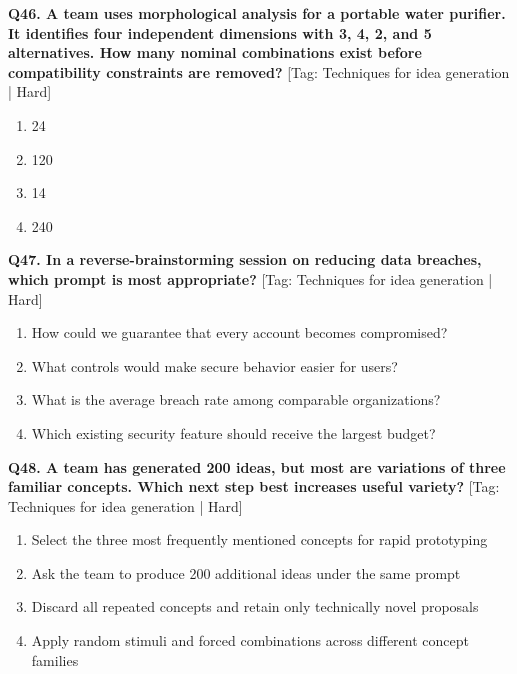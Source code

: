 \noindent\textbf{Q46. A team uses morphological analysis for a portable water purifier. It identifies four independent dimensions with 3, 4, 2, and 5 alternatives. How many nominal combinations exist before compatibility constraints are removed?} \hfill [Tag: Techniques for idea generation | Hard]
\begin{enumerate}[label=(\alph*),topsep=2pt,itemsep=1pt,partopsep=0pt,parsep=0pt]
    \item {24}
    \item {120}
    \item {14}
    \item {240}
\end{enumerate}
\vspace{2mm}

\noindent\textbf{Q47. In a reverse-brainstorming session on reducing data breaches, which prompt is most appropriate?} \hfill [Tag: Techniques for idea generation | Hard]
\begin{enumerate}[label=(\alph*),topsep=2pt,itemsep=1pt,partopsep=0pt,parsep=0pt]
    \item {How could we guarantee that every account becomes compromised?}
    \item {What controls would make secure behavior easier for users?}
    \item {What is the average breach rate among comparable organizations?}
    \item {Which existing security feature should receive the largest budget?}
\end{enumerate}
\vspace{2mm}

\noindent\textbf{Q48. A team has generated 200 ideas, but most are variations of three familiar concepts. Which next step best increases useful variety?} \hfill [Tag: Techniques for idea generation | Hard]
\begin{enumerate}[label=(\alph*),topsep=2pt,itemsep=1pt,partopsep=0pt,parsep=0pt]
    \item {Select the three most frequently mentioned concepts for rapid prototyping}
    \item {Ask the team to produce 200 additional ideas under the same prompt}
    \item {Discard all repeated concepts and retain only technically novel proposals}
    \item {Apply random stimuli and forced combinations across different concept families}
\end{enumerate}
\vspace{2mm}

